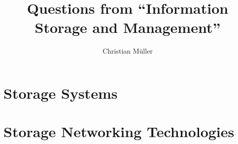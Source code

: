 \documentclass{article}
\begin{document}
\title{Questions from ``Information Storage and Management''}
\author{Christian Müller}

\pagestyle{empty}
\maketitle
\tableofcontents

\pagestyle{headings}
\newpage
\part{Storage Systems} %
\label{prt:storage_ _systems_}
	
	\newpage
	
	\newpage
	
	\newpage
	

\part{Storage Networking Technologies} %
\label{prt:storage_ _networking_ _technologies_}
	
	\newpage
	
	\newpage
	
	\newpage
	
\end{document}
